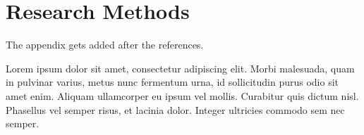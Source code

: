 \documentclass[sigconf, review=true]{acmart}
\begin{document}
\maketitle






\appendix

\section{Research Methods}

The appendix gets added after the references.

Lorem ipsum dolor sit amet, consectetur adipiscing elit. Morbi
malesuada, quam in pulvinar varius, metus nunc fermentum urna, id
sollicitudin purus odio sit amet enim. Aliquam ullamcorper eu ipsum
vel mollis. Curabitur quis dictum nisl. Phasellus vel semper risus, et
lacinia dolor. Integer ultricies commodo sem nec semper.
\end{document}
